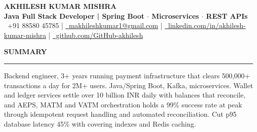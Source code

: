 \documentclass[10pt]{article}
\newcommand{\resumesection}[1]{%
  \vspace{6pt}%
  {\fontfamily{phv}\selectfont\textbf{\large\MakeUppercase{#1}}}%
  \vspace{2pt}%
  \hrule%
  \vspace{4pt}%
}
\begin{document}
\begin{center}
    {\selectfont\textbf{\Huge AKHILESH KUMAR MISHRA}} \\
    \vspace{3pt}
    {\selectfont\large\textbf{\textcolor{primaryblue}{Java Full Stack Developer | Spring Boot $\cdot$ Microservices $\cdot$ REST APIs}}} \\
    \vspace{4pt}
    {\small
    \textcolor{primaryblue}{\faPhone*}~+91 88580 45785 \quad | \quad
    \href{mailto:makhileshkumar1@gmail.com}{\textcolor{primaryblue}{\faEnvelope}~makhileshkumar1@gmail.com} \quad | \quad
    \href{https://linkedin.com/in/akhilesh-kumar-mishra-a46030231}{\textcolor{primaryblue}{\faLinkedin}~linkedin.com/in/akhilesh-kumar-mishra} \quad | \quad
    \href{https://github.com/GitHub-akhilesh}{\textcolor{primaryblue}{\faGithub}~github.com/GitHub-akhilesh}
    }
\end{center}
\vspace{-10pt}

\resumesection{Summary}
Backend engineer, 3+ years running payment infrastructure that clears 500,000+ transactions a day for 2M+ users. Java/Spring Boot, Kafka, microservices. Wallet and ledger services settle over 10 billion INR daily with balances that reconcile, and AEPS, MATM and VATM orchestration holds a 99\% success rate at peak through idempotent request handling and automated reconciliation. Cut p95 database latency 45\% with covering indexes and Redis caching.
\end{document}
